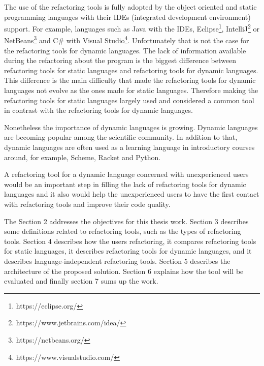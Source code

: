 The use of the refactoring tools is fully adopted by the object oriented and static programming languages with their IDEs (integrated development environment) support.
For example, languages such as Java with the IDEs, Eclipse\footnote{https://eclipse.org/}, IntelliJ\footnote{https://www.jetbrains.com/idea/} or NetBeans\footnote{https://netbeans.org/} and C\# with Visual Studio\footnote{https://www.visualstudio.com/}.
Unfortunately that is not the case for the refactoring tools for dynamic languages. 
The lack of information available during the refactoring about the program is the biggest difference between refactoring tools for static languages and refactoring tools for dynamic languages.
This difference is the main difficulty that made the refactoring tools for dynamic languages not evolve as the ones made for static languages. 
Therefore making the refactoring tools for static languages largely used and considered a common tool in contrast with the refactoring tools for dynamic languages.  %

Nonetheless the importance of dynamic languages is growing. Dynamic languages are becoming popular among the scientific community.
In addition to that, dynamic languages are often used as a learning language in introductory courses around, for example, Scheme, Racket and Python.

A refactoring tool for a dynamic language concerned with unexperienced users would be an important step in filling the lack of refactoring tools for dynamic languages and it also would help the unexperienced users to have the first contact with refactoring tools and improve their code quality.



The Section 2 addresses the objectives for this thesis work. 
Section 3 describes some definitions related to refactoring tools, such as the types of refactoring tools.
Section 4 describes how the users refactoring, it compares refactoring tools for static languages, it describes refactoring tools for dynamic languages, and it describes language-independent refactoring tools.
Section 5 describes the architecture of the proposed solution. 
Section 6 explains how the tool will be evaluated and finally section 7 sums up the work.







